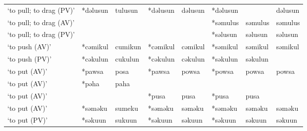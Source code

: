 \begin{landscape}
\begin{longtable}[c]{@{}p{3cm}<{\raggedright}p{2.75cm}<{\raggedright}p{2.75cm}<{\raggedright}p{2.75cm}<{\raggedright}p{2.75cm}<{\raggedright}p{2.75cm}<{\raggedright}p{2.75cm}<{\raggedright}p{2.75cm}<{\raggedright}@{}}
`to pull; to drag (PV)'                              & *dəlusun           & tulusun                        & *dəlusun           & dəlusun                    & *dəlusun         &                          & dəlusun                           \\
`to pull; to drag (AV)'                              &                    &                                &                    &                            & *səmulus         & səmulus                  & səmulus                           \\
`to pull; to drag (PV)'                              &                    &                                &                    &                            & *səlusun         & səlusun                  & səlusun                           \\
`to push (AV)'                                       & *cəmikul           & cumikun                        & *cəmikul           & cəmikul                    & *səmikul         & səmikul                  & səmikul                           \\
`to push (PV)'                                       & *cəkulun           & cukulun                        & *cəkulun           & cəkulun                    & *səkulun         & səkulun                  &                                   \\
`to put (AV)'                                        & *pawsa             & posa                           & *pawsa             & powsa                      & *powsa           & powsa                    & powsa                             \\
`to put (AV)'                                        & *pəha              & paha                           &                    &                            &                  &                          &                                   \\
`to put (AV)'                                        &                    &                                & *pusa              & pusa                       & *pusa            & pusa                     &                                   \\
`to put (AV)'                                        & *səməku            & sumeku                         & *səməku            & səməku                     & *səməku          & səməku                   & səməku                            \\
`to put (PV)'                                        & *səkuun            & sukuun                         & *səkuun            & səkuun                     & *səkuun          & səkuun                   & səkuun                            \\

\end{longtable}
\end{landscape}
